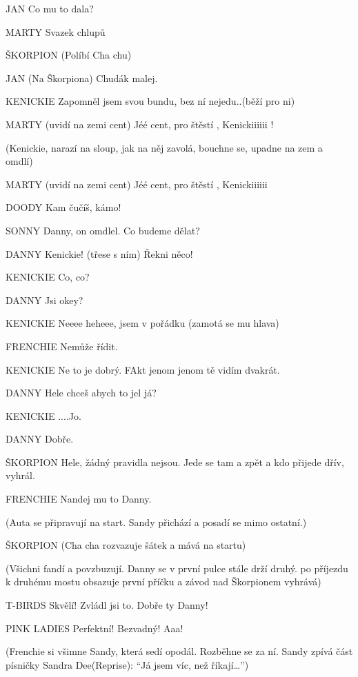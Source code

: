 JAN        Co mu to dala?

MARTY        Svazek chlupů

ŠKORPION        (Políbí Cha chu)

JAN        (Na Škorpiona) Chudák malej. 

KENICKIE            Zapomněl jsem svou bundu, bez ní nejedu..(běží pro ni)

MARTY (uvidí na zemi cent)  Jéé cent,  pro štěstí , Kenickiiiiii !

(Kenickie, narazí na sloup, jak na něj zavolá, bouchne se, upadne na zem a omdlí)

MARTY (uvidí na zemi cent)  Jéé cent,  pro štěstí , Kenickiiiiii

DOODY        Kam čučíš, kámo!

SONNY        Danny,  on omdlel. Co budeme dělat? 

DANNY        Kenickie! (třese s ním) Řekni něco!

KENICKIE         Co, co? 

DANNY        Jsi okey? 

KENICKIE        Neeee heheee, jsem v pořádku (zamotá se mu hlava) 

FRENCHIE        Nemůže řídit. 

KENICKIE         Ne to je dobrý. FAkt jenom jenom tě vidím dvakrát. 

DANNY        Hele chceš abych to jel já? 

KENICKIE        ....Jo.

DANNY        Dobře. 

ŠKORPION        Hele, žádný pravidla nejsou. Jede se tam a zpět a kdo přijede dřív,         vyhrál. 

FRENCHIE        Nandej mu to Danny. 

(Auta se připravují na start. Sandy přichází a posadí se mimo ostatní.)

ŠKORPION         (Cha cha rozvazuje šátek a mává na startu)

                (Všichni fandí a povzbuzují. Danny se v první pulce stále drží druhý.                po příjezdu k druhému mostu obsazuje první příčku a závod nad                 Škorpionem vyhrává)

T-BIRDS        Skvělí! Zvládl jsi to. Dobře ty Danny!

PINK LADIES        Perfektní! Bezvadný! Aaa!





(Frenchie si všimne Sandy, která sedí opodál. Rozběhne se za ní. Sandy zpívá část písničky Sandra Dee(Reprise): “Já jsem víc, než říkají…”)





